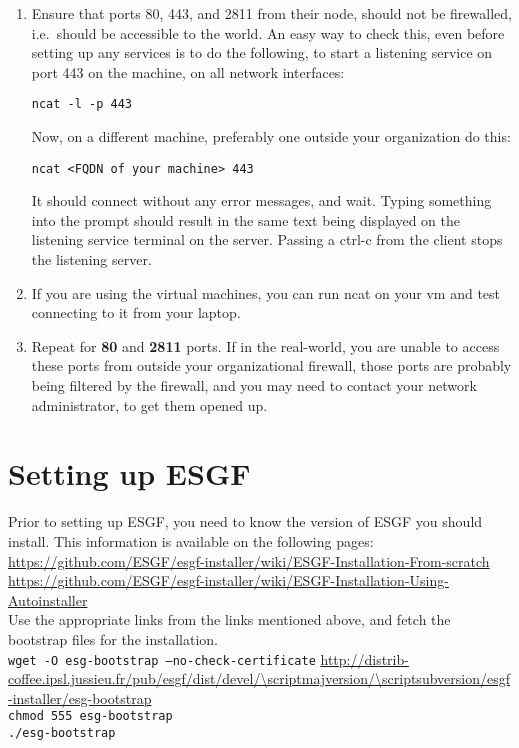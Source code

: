 \begin{enumerate}
\tightlist
\item
  Ensure that ports 80, 443, and 2811 from their node, should not be
  firewalled, i.e.~should be accessible to the world. An easy way to
  check this, even before setting up any services is to do the following, to start a listening service on port 443 on the machine, on all network interfaces:
\begin{verbatim}
ncat -l -p 443
\end{verbatim}
Now, on a different machine, preferably one outside your organization do this:
\begin{verbatim}
ncat <FQDN of your machine> 443
\end{verbatim}
It should connect without any error messages, and wait. Typing something into the prompt should
  result in the same text being displayed on the listening service
  terminal on the server. Passing a ctrl-c from the client stops the
  listening server. 
\item If you are using the virtual machines, you can run ncat on your vm and test connecting to it from your laptop.
\item Repeat for \textbf{80} and \textbf{2811} ports. If in the real-world, you are unable to access these ports from outside your organizational firewall, those ports are probably being filtered by the firewall, and you may need to contact your network administrator, to get them opened up. 
\end{enumerate}

\section{Setting up ESGF}

Prior to setting up ESGF, you need to know the version of ESGF you should install. This information is available on the following pages:\\
\url{https://github.com/ESGF/esgf-installer/wiki/ESGF-Installation-From-scratch}\\
\url{https://github.com/ESGF/esgf-installer/wiki/ESGF-Installation-Using-Autoinstaller}\\

Use the appropriate links from the links mentioned above, and fetch the bootstrap files for the installation.\\
\texttt{wget -O esg-bootstrap --no-check-certificate} \url{http://distrib-coffee.ipsl.jussieu.fr/pub/esgf/dist/devel/\scriptmajversion/\scriptsubversion/esgf-installer/esg-bootstrap}\\
\texttt{chmod 555 esg-bootstrap}\\
\texttt{./esg-bootstrap}

